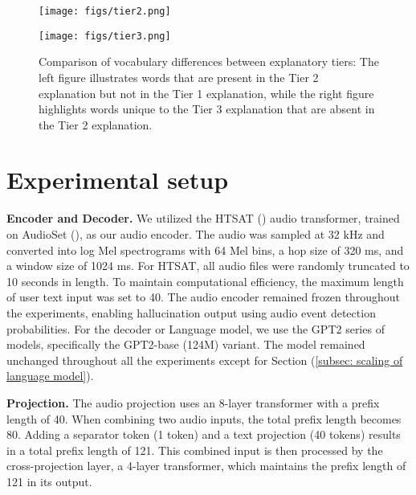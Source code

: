 \begin{figure*}
    \centering
    \begin{minipage}{0.49\textwidth}
        \texttt{[image: figs/tier2.png]}
     \label{fig:datagen1}
    \end{minipage}
    \hfill
    \begin{minipage}{0.49\textwidth}
        \texttt{[image: figs/tier3.png]}
     \label{fig:datagen2}
    \end{minipage}
    \vspace{-0.2in}
    \caption{\small Comparison of vocabulary differences between explanatory tiers: The left figure illustrates words that are present in the Tier 2 explanation but not in the Tier 1 explanation, while the right figure highlights words unique to the Tier 3 explanation that are absent in the Tier 2 explanation.\label{fig:datagen3}}
\end{figure*}

\section{Experimental setup} \label{appendix: exp setup} \vspace{-0.1in}
\textbf{Encoder and Decoder.}  We utilized the HTSAT (\cite{chen2022hts}) audio transformer, trained on AudioSet (\cite{audioset}), as our audio encoder. The audio was sampled at 32 kHz and converted into log Mel spectrograms with 64 Mel bins, a hop size of 320 ms, and a window size of 1024 ms. For HTSAT, all audio files were randomly truncated to 10 seconds in length. To maintain computational efficiency, the maximum length of user text input was set to 40. The audio encoder remained frozen throughout the experiments, enabling hallucination output using audio event detection probabilities. For the decoder or Language model, we use the GPT2 series of models, specifically the GPT2-base (124M) variant. The model remained unchanged throughout all the experiments except for Section (\ref{subsec: scaling of language model}).

\textbf{Projection.} The audio projection uses an 8-layer transformer with a prefix length of 40. When combining two audio inputs, the total prefix length becomes 80. Adding a separator token (1 token) and a text projection (40 tokens) results in a total prefix length of 121. This combined input is then processed by the cross-projection layer, a 4-layer transformer, which maintains the prefix length of 121 in its output.

